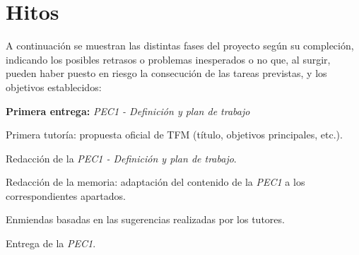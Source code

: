 \documentclass[IB,BIB]{TFUOC}%
\newcommand{\checkbox}{\text{\fboxsep=-.15pt\fbox{\rule{0pt}{1.5ex}\rule{1.5ex}{0pt}}}} %
\newcommand{\cmark}{\ding{51}} %
\newcommand{\xmark}{\ding{55}} %
\newcommand{\done}{\rlap{\checkbox}{\raisebox{1.2pt}{\large\hspace{1pt}\cmark}}
\hspace{-2.5pt}}
\newcommand{\wontfix}{\rlap{\checkbox}{\raisebox{-1.5pt}{\large\hspace{-.75pt}\xmark}}
\hspace{-2.5pt}}
\begin{document}
\newpage


\section{Hitos}
\label{sec:Hitos}

A continuación se muestran las distintas fases del proyecto según su compleción, indicando los posibles retrasos o problemas inesperados o no que, al surgir, pueden haber puesto en riesgo la consecución de las tareas previstas, y los objetivos establecidos:

\scriptsize


\begin{todolist}
  \item[\done] \textbf{Primera entrega:} \textit{PEC1 - Definición y plan de trabajo}
  \begin{todolist}
  \item[\done] Primera tutoría: propuesta oficial de TFM (título, objetivos principales, etc.).
  \item[\done] Redacción de la \textit{PEC1 - Definición y plan de trabajo}.
  \item[\done] Redacción de la memoria: adaptación del contenido de la \textit{PEC1} a los correspondientes apartados.
  \item[\done] Enmiendas basadas en las sugerencias realizadas por los tutores.
  \item[\done] Entrega de la \textit{PEC1}.
  \end{todolist}
\end{todolist}
\end{document}
